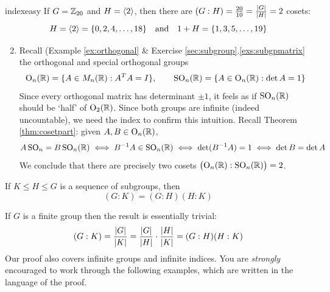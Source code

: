 \begin{examples}{}{indexeasy}
	\exstart If $G=\mathbb{Z}_{20}$ and $H=\left\langle 2\right\rangle$, then there are $(G:H)=\frac{20}{10}=\frac{\left| G\right|}{\left| H\right|}=2$ cosets:
	\[
		H=\left\langle 2\right\rangle=\{0,2,4,\ldots,18\}
		\quad\text{and}\quad 
		1+H=\{1,3,5,\ldots,19\}
		\]
	\begin{enumerate}\setcounter{enumi}{1}
	  \item Recall (Example \ref{ex:orthogonal} \& Exercise %
	  \ref*{sec:subgroup}.\ref{exs:subgpmatrix} the orthogonal and special orthogonal groups
	  \[
	  	\mathrm{O}_n(\mathbb{R})=\{A\in M_n(\mathbb{R}):A^TA=I\},\qquad
	  	\mathrm{SO}_n(\mathbb{R})=\{A\in\mathrm{O}_n(\mathbb{R}):\det A=1\}
	  \]
	  Since every orthogonal matrix has determinant $\pm 1$, it feels as if $\mathrm{SO}_n(\mathbb{R})$ should be `half' of $\mathrm{O}_2(\mathbb{R})$. Since both groups are infinite (indeed uncountable), we need the index to confirm this intuition. Recall Theorem \ref{thm:cosetpart}: given $A,B\in\mathrm{O}_n(\mathbb{R})$,
	  \[
	  	A\,\mathrm{SO}_n=B\,\mathrm{SO}_n(\mathbb{R})
	  	\iff B^{-1}A\in\mathrm{SO}_n(\mathbb{R})
	  	\iff \det(B^{-1}A)=1
	  	\iff \det B=\det A
	  \]
	  We conclude that there are precisely two cosets $\bigl(\mathrm{O}_n(\mathbb{R}):\mathrm{SO}_n(\mathbb{R})\bigr)=2$.
	\end{enumerate}
\end{examples}

\begin{thm}{}{}
	If $K\le H\le G$ is a sequence of subgroups, then
	\[
		(G:K)=(G:H)(H:K)
	\]
\end{thm}

If $G$ is a finite group then the result is essentially trivial:
\[
	(G:K)=\frac{\left| G\right|}{\left| K\right|}
	=\frac{\left| G\right|}{\left| H\right|}\cdot\frac{\left| H\right|}{\left| K\right|}
	=(G:H)(H:K)
\]
Our proof also covers infinite groups and infinite indices. You are \emph{strongly} encouraged to work through the following examples, which are written in the language of the proof.



